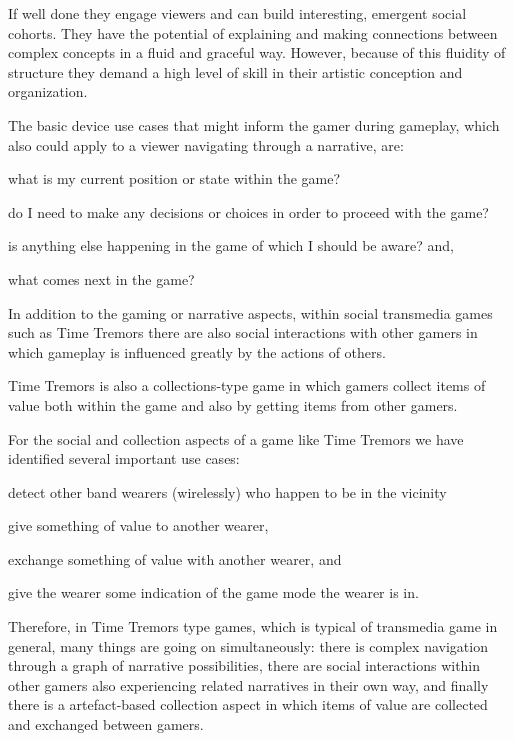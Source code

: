 \documentclass{chi-ext}
\begin{document}
If well done they engage viewers and can build interesting, emergent social cohorts. They have the potential of explaining and making connections between complex concepts in a fluid and graceful way. However, because of this fluidity of structure they demand a high level of skill in their artistic conception and organization. 


The basic device use cases that might inform the gamer during gameplay, which also could apply to a viewer navigating through a narrative, are: 
\begin{inparaenum}
  \item what is my current position or state within the game?
  \item do I need to make any decisions or choices in order to proceed with the game?
  \item is anything else happening in the game of which I should be aware? and,
  \item what comes next in the game? 
\end{inparaenum}

In addition to the gaming or narrative aspects, within social transmedia games such as Time Tremors there are also social interactions with other gamers in which gameplay is influenced greatly by the actions of others. 

Time Tremors is also a collections-type game in which gamers collect items of value both within the game and also by getting items from other gamers. 

For the social and collection aspects of a game like Time Tremors we have identified several important use cases: 
\begin{inparaenum}
\item detect other band wearers (wirelessly) who happen to be in the vicinity
\item give something of value to another wearer, 
\item exchange something of value with another wearer, and
\item give the wearer some indication of the game mode the wearer is in.
\end{inparaenum}

Therefore, in Time Tremors type games, which is typical of transmedia game in general, many things are going on simultaneously: there is complex navigation through a graph of narrative possibilities, there are social interactions within other gamers also experiencing related narratives in their own way, and finally there is a artefact-based collection aspect in which items of value are collected and exchanged between gamers. 
\end{document}
